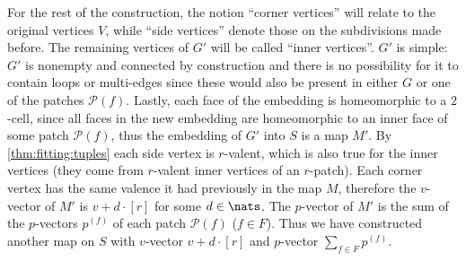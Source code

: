 \begin{construction}
\begin{cdescription}
For the rest of the construction, the notion ``corner vertices'' will relate to the original vertices $V$, while ``side vertices'' denote those on the subdivisions made before. The remaining vertices of $G'$ will be called ``inner vertices''. $G'$ is simple: $G'$ is nonempty and connected by construction and there is no possibility for it to contain loops or multi-edges since these would also be present in either $G$ or one of the patches $\mathcal{P}(f)$. Lastly, each face of the embedding is homeomorphic to a $2$-cell, since all faces in the new embedding are homeomorphic to an inner face of some patch $\mathcal{P}(f)$, thus the embedding of $G'$ into $S$ is a map $M'$. By \autoref{thm:fitting:tuples} each side vertex is $r$-valent, which is also true for the inner vertices (they come from $r$-valent inner vertices of an $r$-patch). Each corner vertex has the same valence it had previously in the map $M$, therefore the $v$-vector of $M'$ is $v + d \cdot [r]$ for some $d \in \nats$. The $p$-vector of $M'$ is the sum of the $p$-vectors $p^{(f)}$ of each patch $\mathcal{P}(f)$ ($f \in F$). Thus we have constructed another map on $S$ with $v$-vector $v + d \cdot [r]$ and $p$-vector $\sum_{f \in F} p^{(f)}$.
  \end{cdescription}
\end{construction}
